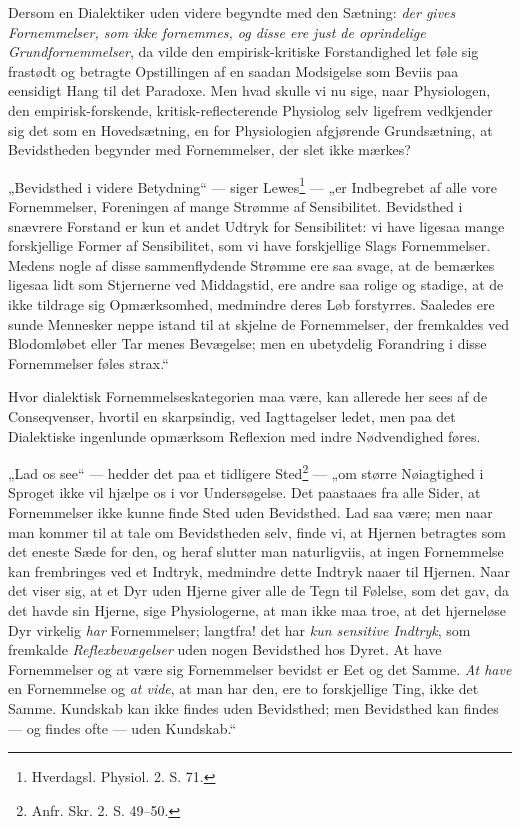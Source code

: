 \documentclass[11pt]{book}
\newcommand{\opage}[1]{\marginnote{\footnotesize\textit{[#1]}}}
\begin{document}
Dersom en Dialektiker uden videre begyndte med den Sætning: \emph{der gives
Fornemmelser, som ikke fornemmes, og disse ere just de oprindelige
Grundfornemmelser}, da vilde den empirisk-kritiske Forstandighed let føle sig
frastødt og betragte Opstillingen af en saadan Modsigelse som Beviis paa
eensidigt Hang til det Paradoxe. Men hvad skulle vi nu sige, naar
Physiologen, den empirisk-forskende, kritisk-reflecterende Physiolog selv
ligefrem vedkjender sig det som en Hovedsætning, en for Physiologien
afgjørende Grundsætning, at Bevidstheden begynder med Fornemmelser, der slet
ikke mærkes?

„Bevidsthed i videre Betydning“ --- siger Lewes\footnote{%
Hverdagsl. Physiol. 2. S. 71.} --- „er Indbegrebet af alle vore
Fornemmelser, Foreningen af mange Strømme af Sensibilitet. Bevidsthed i
snævrere Forstand er kun et andet Udtryk for Sensibilitet: vi have ligesaa
mange forskjellige Former af Sensibilitet, som vi have forskjellige Slags
Fornemmelser. Medens nogle af disse sammenflydende Strømme ere saa svage, at
de bemærkes ligesaa lidt som Stjernerne ved Middagstid, ere andre saa rolige
og stadige, at de ikke tildrage sig Opmærksomhed, medmindre deres Løb
forstyrres. Saaledes ere sunde Mennesker neppe istand til at skjelne de
Fornemmelser, der fremkaldes ved Blodomløbet eller Tar\-%
\opage{337} \setcounter{footnote}{0}%
menes Bevægelse; men en ubetydelig Forandring i disse Fornemmelser føles
strax.“

Hvor dialektisk Fornemmelseskategorien maa være, kan allerede her sees af de
Conseqvenser, hvortil en skarpsindig, ved Iagttagelser ledet, men paa det
Dialektiske ingenlunde opmærksom Reflexion med indre Nødvendighed føres.

„Lad os see“ --- hedder det paa et tidligere Sted\footnote{%
Anfr. Skr. 2. S. 49--50.} --- „om større Nøiagtighed i Sproget ikke vil
hjælpe os i vor Undersøgelse. Det paastaaes fra alle Sider, at Fornemmelser
ikke kunne finde Sted uden Bevidsthed. Lad saa være; men naar man kommer til
at tale om Bevidstheden selv, finde vi, at Hjernen betragtes som det eneste
Sæde for den, og heraf slutter man naturligviis, at ingen Fornemmelse kan
frembringes ved et Indtryk, medmindre dette Indtryk naaer til Hjernen. Naar
det viser sig, at et Dyr uden Hjerne giver alle de Tegn til Følelse, som det
gav, da det havde sin Hjerne, sige Physiologerne, at man ikke maa troe, at
det hjerneløse Dyr virkelig \emph{har} Fornemmelser; langtfra! det har
\emph{kun sensitive Indtryk}, som fremkalde \emph{Reflexbevægelser} uden
nogen Bevidsthed hos Dyret. At have Fornemmelser og at være sig Fornemmelser
bevidst er Eet og det Samme. \emph{At have} en Fornemmelse og \emph{at vide},
at man har den, ere to forskjellige Ting, ikke det Samme. Kundskab kan ikke
findes uden Bevidsthed; men Bevidsthed kan findes --- og findes ofte --- uden
Kundskab.“
\end{document}
